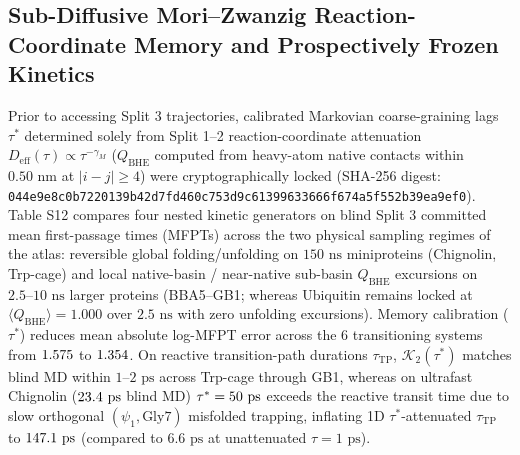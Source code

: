 \documentclass[10pt,letterpaper]{article}
\begin{document}
\subsection{Sub-Diffusive Mori--Zwanzig Reaction-Coordinate Memory and Prospectively Frozen Kinetics}
Prior to accessing Split 3 trajectories, calibrated Markovian coarse-graining lags $\tau^*$ determined solely from Split 1--2 reaction-coordinate attenuation $D_{\mathrm{eff}}(\tau)\propto\tau^{-\gamma_M}$ ($Q_{\mathrm{BHE}}$ computed from heavy-atom native contacts within $0.50\text{ nm}$ at $|i-j|\ge 4$) were cryptographically locked (SHA-256 digest: \texttt{044e9e8c0b7220139b42d7fd460c753d}\allowbreak\texttt{9c61399633666f674a5f552b39ea9ef0}). Table S12 compares four nested kinetic generators on blind Split 3 committed mean first-passage times (MFPTs) across the two physical sampling regimes of the atlas: reversible global folding/unfolding on $150\text{ ns}$ miniproteins (Chignolin, Trp-cage) and local native-basin / near-native sub-basin $Q_{\mathrm{BHE}}$ excursions on $2.5\text{--}10\text{ ns}$ larger proteins (BBA5--GB1; whereas Ubiquitin remains locked at $\langle Q_{\mathrm{BHE}}\rangle = 1.000$ over $2.5\text{ ns}$ with zero unfolding excursions). Memory calibration ($\tau^*$) reduces mean absolute log-MFPT error across the 6 transitioning systems from $1.575{}$ to $1.354{}$. On reactive transition-path durations $\tau_{\mathrm{TP}}$, $\mathcal{K}_2(\tau^*)$ matches blind MD within $1\text{--}2\text{ ps}$ across Trp-cage through GB1, whereas on ultrafast Chignolin ($23.4{}\text{ ps}$ blind MD) $\tau^* = 50{}\text{ ps}$ exceeds the reactive transit time due to slow orthogonal $(\psi_1,\text{Gly7})$ misfolded trapping, inflating 1D $\tau^*$-attenuated $\tau_{\mathrm{TP}}$ to $147.1{}\text{ ps}$ (compared to $6.6\text{ ps}$ at unattenuated $\tau = 1\text{ ps}$).
\end{document}

